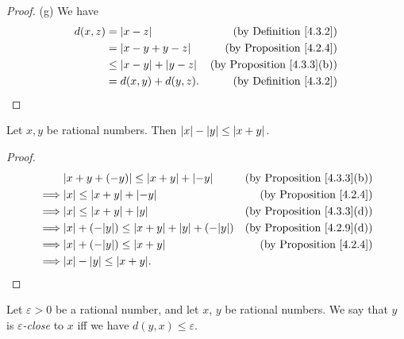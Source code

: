 \begin{proof}{(g)}
    We have
    \begin{align*}
        d(x, z) & = \abs*{x - z}                   & \text{(by Definition \ref{4.3.2})}     \\
                & = \abs*{x - y + y - z}           & \text{(by Proposition \ref{4.2.4})}    \\
                & \leq \abs*{x - y} + \abs*{y - z} & \text{(by Proposition \ref{4.3.3}(b))} \\
                & = d(x, y) + d(y, z).             & \text{(by Definition \ref{4.3.2})}     \\
    \end{align*}
\end{proof}

\begin{additional corollary}\label{ac 4.3.1}
Let \(x, y\) be rational numbers.
Then \(\abs*{x} - \abs*{y} \leq \abs*{x + y}\).
\end{additional corollary}

\begin{proof}
    \begin{align*}
                 & \abs*{x + y + (-y)} \leq \abs*{x + y} + \abs*{-y}                 & \text{(by Proposition \ref{4.3.3}(b))} \\
        \implies & \abs*{x} \leq \abs*{x + y} + \abs*{-y}                            & \text{(by Proposition \ref{4.2.4})}    \\
        \implies & \abs*{x} \leq \abs*{x + y} + \abs*{y}                             & \text{(by Proposition \ref{4.3.3}(d))} \\
        \implies & \abs*{x} + (-\abs*{y}) \leq \abs*{x + y} + \abs*{y} + (-\abs*{y}) & \text{(by Proposition \ref{4.2.9}(d))} \\
        \implies & \abs*{x} + (-\abs*{y}) \leq \abs*{x + y}                          & \text{(by Proposition \ref{4.2.4})}    \\
        \implies & \abs*{x} - \abs*{y} \leq \abs*{x + y}.
    \end{align*}
\end{proof}

\begin{definition}\label{4.3.4}
    Let \(\varepsilon > 0\) be a rational number, and let \(x\), \(y\) be rational numbers.
    We say that \(y\) is \emph{\(\varepsilon\)-close} to \(x\) iff we have \(d(y, x) \leq \varepsilon\).
\end{definition}

